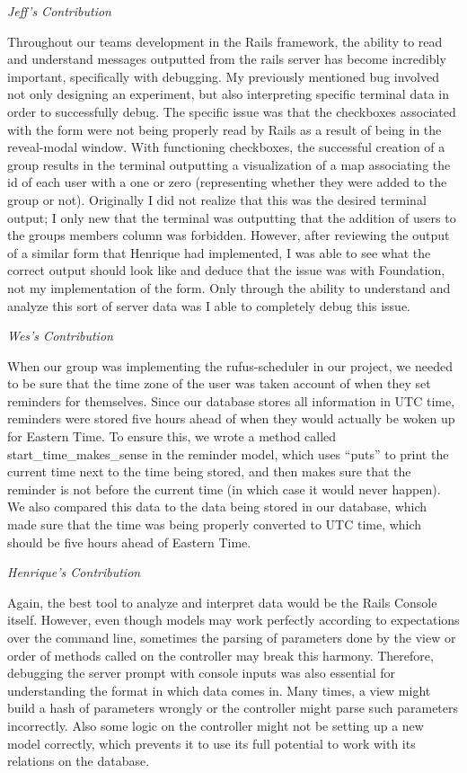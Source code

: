 \documentclass[11pt]{article}
\begin{document}
\textit{Jeff's Contribution}

Throughout our teams development in the Rails framework, the ability to read and understand messages outputted from the rails server has become incredibly important, specifically with debugging.  My previously mentioned bug involved not only designing an experiment, but also interpreting specific terminal data in order to successfully debug.  The specific issue was that the checkboxes associated with the form were not being properly read by Rails as a result of being in the reveal-modal window.  With functioning checkboxes, the successful creation of a group results in the terminal outputting a visualization of a map associating the id of each user with a one or zero (representing whether they were added to the group or not).  Originally I did not realize that this was the desired terminal output; I only new that the terminal was outputting that the addition of users to the groups members column was forbidden.  However, after reviewing the output of a similar form that Henrique had implemented, I was able to see what the correct output should look like and deduce that the issue was with Foundation, not my implementation of the form.  Only through the ability to understand and analyze this sort of server data was I able to completely debug this issue.

\textit{Wes's Contribution}

When our group was implementing the rufus-scheduler in our project, we needed to be sure that the time zone of the user was taken account of when they set reminders for themselves.  Since our database stores all information in UTC time, reminders were stored five hours ahead of when they would actually be woken up for Eastern Time.  To ensure this, we wrote a method called start\_time\_makes\_sense in the reminder model, which uses “puts” to print the current time next to the time being stored, and then makes sure that the reminder is not before the current time (in which case it would never happen).  We also compared this data to the data being stored in our database, which made sure that the time was being properly converted to UTC time, which should be five hours ahead of Eastern Time.

\textit{Henrique's Contribution}

Again, the best tool to analyze and interpret data would be the Rails Console itself. However, even though models may work perfectly according to expectations over the command line, sometimes the parsing of parameters done by the view or order of methods called on the controller may break this harmony. Therefore, debugging the server prompt with console inputs was also essential for understanding the format in which data comes in. Many times, a view might build a hash of parameters wrongly or the controller might parse such parameters incorrectly. Also some logic on the controller might not be setting up a new model correctly, which prevents it to use its full potential to work with its relations on the database.
\end{document}
